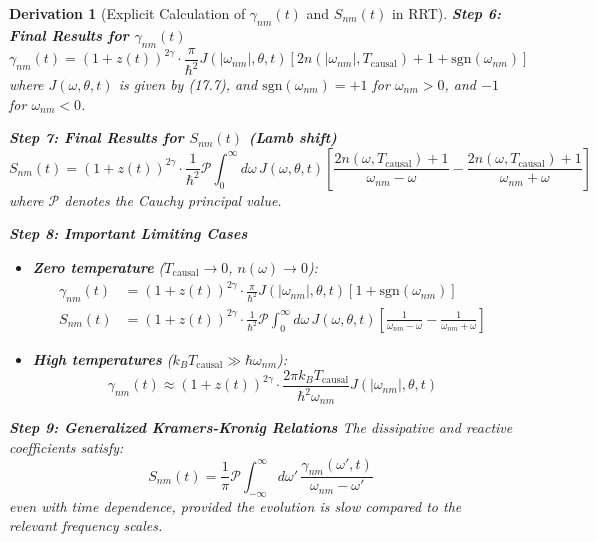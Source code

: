 \documentclass[10pt, a4paper]{article}
\newtheorem{derivation}{Derivation}
\begin{document}
\begin{derivation}[Explicit Calculation of $\gamma_{nm}(t)$ and $S_{nm}(t)$ in RRT]
\textbf{Step 6: Final Results for $\gamma_{nm}(t)$}
\begin{equation}
\gamma_{nm}(t) = (1+z(t))^{2\gamma} \cdot \frac{\pi}{\hbar^2} J(|\omega_{nm}|, \theta, t) [2n(|\omega_{nm}|, T_{\text{causal}}) + 1 + \text{sgn}(\omega_{nm})]
\tag{26.9}
\end{equation}
where $J(\omega, \theta, t)$ is given by (17.7), and $\text{sgn}(\omega_{nm}) = +1$ for $\omega_{nm} > 0$, and $-1$ for $\omega_{nm} < 0$.

\textbf{Step 7: Final Results for $S_{nm}(t)$ (Lamb shift)}
\begin{equation}
S_{nm}(t) = (1+z(t))^{2\gamma} \cdot \frac{1}{\hbar^2} \mathcal{P} \int_0^\infty d\omega \, J(\omega, \theta, t) \left[ \frac{2n(\omega, T_{\text{causal}})+1}{\omega_{nm}-\omega} - \frac{2n(\omega, T_{\text{causal}})+1}{\omega_{nm}+\omega} \right]
\tag{26.10}
\end{equation}
where $\mathcal{P}$ denotes the Cauchy principal value.

\textbf{Step 8: Important Limiting Cases}
\begin{itemize}
\item \textbf{Zero temperature} ($T_{\text{causal}} \to 0$, $n(\omega) \to 0$):
\begin{align}
\gamma_{nm}(t) &= (1+z(t))^{2\gamma} \cdot \frac{\pi}{\hbar^2} J(|\omega_{nm}|, \theta, t) [1 + \text{sgn}(\omega_{nm})]
\tag{26.11} \\
S_{nm}(t) &= (1+z(t))^{2\gamma} \cdot \frac{1}{\hbar^2} \mathcal{P} \int_0^\infty d\omega \, J(\omega, \theta, t) \left[ \frac{1}{\omega_{nm}-\omega} - \frac{1}{\omega_{nm}+\omega} \right]
\tag{26.12}
\end{align}

\item \textbf{High temperatures} ($k_B T_{\text{causal}} \gg \hbar\omega_{nm}$):
\begin{equation}
\gamma_{nm}(t) \approx (1+z(t))^{2\gamma} \cdot \frac{2\pi k_B T_{\text{causal}}}{\hbar^2 \omega_{nm}} J(|\omega_{nm}|, \theta, t)
\tag{26.13}
\end{equation}
\end{itemize}

\textbf{Step 9: Generalized Kramers-Kronig Relations}
The dissipative and reactive coefficients satisfy:
\begin{equation}
S_{nm}(t) = \frac{1}{\pi} \mathcal{P} \int_{-\infty}^\infty d\omega' \, \frac{\gamma_{nm}(\omega', t)}{\omega_{nm} - \omega'}
\tag{26.14}
\end{equation}
even with time dependence, provided the evolution is slow compared to the relevant frequency scales.


\end{derivation}
\end{document}

